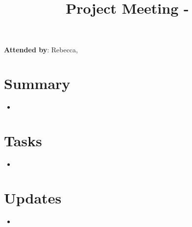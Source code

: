 \documentclass{article}
\title{Project Meeting - }
\date{}
\begin{document}
\maketitle

\textbf{Attended by}: Rebecca,


\section{Summary}

\begin{itemize}
    \item
\end{itemize}


\section{Tasks}

\begin{itemize}
    \item 
\end{itemize}

\section{Updates}

\begin{itemize}
    \item 
\end{itemize}
\end{document}
